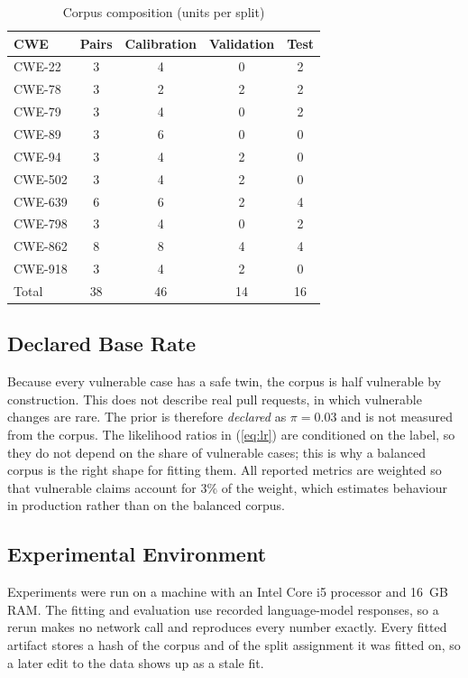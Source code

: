 \documentclass[conference]{IEEEtran}
\begin{document}
\begin{table}[t]
\centering
\caption{Corpus composition (units per split)}
\label{tab:corpus}
\small
\setlength{\tabcolsep}{4pt}
\begin{tabular}{lcccc}
\toprule
CWE & Pairs & Calibration & Validation & Test \\
\midrule
CWE-22  & 3 & 4 & 0 & 2 \\
CWE-78  & 3 & 2 & 2 & 2 \\
CWE-79  & 3 & 4 & 0 & 2 \\
CWE-89  & 3 & 6 & 0 & 0 \\
CWE-94  & 3 & 4 & 2 & 0 \\
CWE-502 & 3 & 4 & 2 & 0 \\
CWE-639 & 6 & 6 & 2 & 4 \\
CWE-798 & 3 & 4 & 0 & 2 \\
CWE-862 & 8 & 8 & 4 & 4 \\
CWE-918 & 3 & 4 & 2 & 0 \\
\midrule
Total   & 38 & 46 & 14 & 16 \\
\bottomrule
\end{tabular}
\end{table}

\subsection{Declared Base Rate}
Because every vulnerable case has a safe twin, the corpus is half
vulnerable by construction. This does not describe real pull requests, in
which vulnerable changes are rare. The prior is therefore \emph{declared}
as $\pi=0.03$ and is not measured from the corpus. The likelihood ratios in
(\ref{eq:lr}) are conditioned on the label, so they do not depend on the
share of vulnerable cases; this is why a balanced corpus is the right shape
for fitting them. All reported metrics are weighted so that vulnerable
claims account for $3\%$ of the weight, which estimates behaviour in
production rather than on the balanced corpus.

\subsection{Experimental Environment}
Experiments were run on a machine with an Intel Core i5 processor and
16~GB RAM. The fitting and evaluation use recorded language-model
responses, so a rerun makes no network call and reproduces every number
exactly. Every fitted artifact stores a hash of the corpus and of the split
assignment it was fitted on, so a later edit to the data shows up as a stale
fit.
\end{document}
